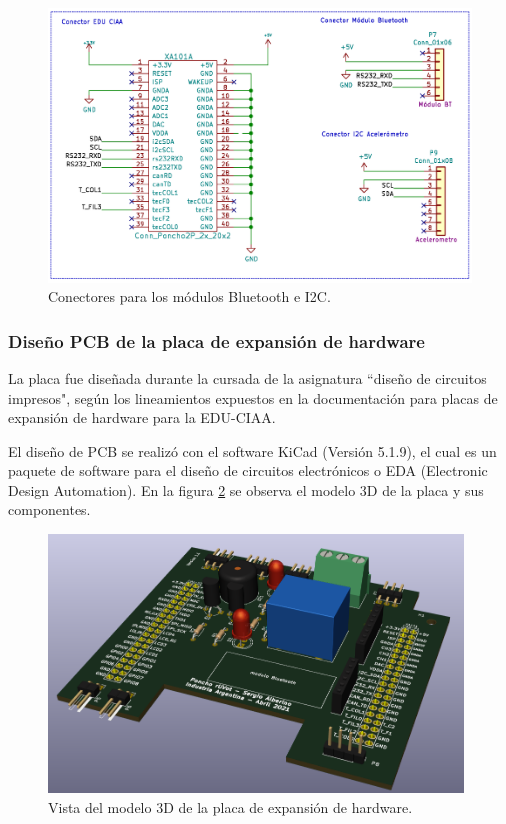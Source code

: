 \begin{figure}[h]
	\centering
	\includegraphics[width=13cm]{./Figures/conectorbt2.PNG}
	\caption{Conectores para los módulos Bluetooth e I2C.}
	\label{fig:conectorbt}
\end{figure}




		\subsubsection{Diseño PCB de la placa de expansión de hardware}


La placa fue diseñada durante la cursada de la asignatura “diseño de circuitos impresos", según los lineamientos expuestos en la documentación para placas de expansión de hardware para la EDU-CIAA. 

El diseño de PCB se realizó con el software KiCad \citep{KiCad} (Versión 5.1.9), el cual es un paquete de software para el diseño de circuitos electrónicos o EDA (Electronic Design Automation). En la figura \ref{fig:poncho3d} se observa el modelo 3D de la placa y sus componentes. 

\begin{figure}[h]
	\centering
	\includegraphics[width=11cm]{./Figures/ponchoiso.PNG}
	\caption{Vista del modelo 3D de la placa de expansión de hardware.}
	\label{fig:poncho3d}
\end{figure}


